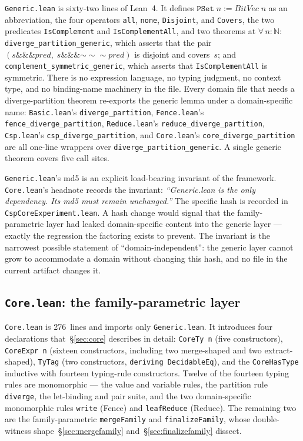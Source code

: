 \documentclass[acmsmall,screen,review,anonymous,nonacm]{acmart}
\newcommand{\PSet}{\texttt{PSet}}
\newcommand{\IsComplement}{\texttt{IsComplement}}
\newcommand{\IsComplementAll}{\texttt{IsComplementAll}}
\newcommand{\CoreHasType}{\texttt{CoreHasType}}
\newcommand{\TyTag}{\texttt{TyTag}}
\begin{document}
\texttt{Generic.lean} is sixty-two lines of Lean~4. It defines $\PSet\;n := \mathit{BitVec}\;n$ as an abbreviation, the four operators \texttt{all}, \texttt{none}, \texttt{Disjoint}, and \texttt{Covers}, the two predicates \IsComplement{} and \IsComplementAll{}, and two theorems at $\forall\,n : \mathbb{N}$: \texttt{diverge\_partition\_generic}, which asserts that the pair $(s \mathbin{\&\&\&} \mathit{pred},\; s \mathbin{\&\&\&} {\mathord{\sim\!\sim\!\sim}\mathit{pred}})$ is disjoint and covers~$s$; and \texttt{complement\_symmetric\_generic}, which asserts that \IsComplementAll{} is symmetric. There is no expression language, no typing judgment, no context type, and no binding-name machinery in the file. Every domain file that needs a diverge-partition theorem re-exports the generic lemma under a domain-specific name: \texttt{Basic.lean}'s \texttt{diverge\_partition}, \texttt{Fence.lean}'s \texttt{fence\_diverge\_partition}, \texttt{Reduce.lean}'s \texttt{reduce\_diverge\_partition}, \texttt{Csp.lean}'s \texttt{csp\_diverge\_partition}, and \texttt{Core.lean}'s \texttt{core\_diverge\_partition} are all one-line wrappers over \texttt{diverge\_partition\_generic}. A single generic theorem covers five call sites.

\texttt{Generic.lean}'s md5 is an explicit load-bearing invariant of the framework. \texttt{Core.lean}'s headnote records the invariant: \emph{``Generic.lean is the only dependency. Its md5 must remain unchanged.''} The specific hash is recorded in \texttt{CspCoreExperiment.lean}. A hash change would signal that the family-parametric layer had leaked domain-specific content into the generic layer --- exactly the regression the factoring exists to prevent. The invariant is the narrowest possible statement of ``domain-independent'': the generic layer cannot grow to accommodate a domain without changing this hash, and no file in the current artifact changes it.

\subsection{\texttt{Core.lean}: the family-parametric layer}\label{sec:core-lean}

\texttt{Core.lean} is 276~lines and imports only \texttt{Generic.lean}. It introduces four declarations that~\S\ref{sec:core} describes in detail: \texttt{CoreTy n} (five constructors), \texttt{CoreExpr n} (sixteen constructors, including two merge-shaped and two extract-shaped), \TyTag{} (two constructors, \texttt{deriving DecidableEq}), and the \CoreHasType{} inductive with fourteen typing-rule constructors. Twelve of the fourteen typing rules are monomorphic --- the value and variable rules, the partition rule \texttt{diverge}, the let-binding and pair suite, and the two domain-specific monomorphic rules \texttt{write} (Fence) and \texttt{leafReduce} (Reduce). The remaining two are the family-parametric \texttt{mergeFamily} and \texttt{finalizeFamily}, whose double-witness shape~\S\ref{sec:mergefamily} and~\S\ref{sec:finalizefamily} dissect.
\end{document}
